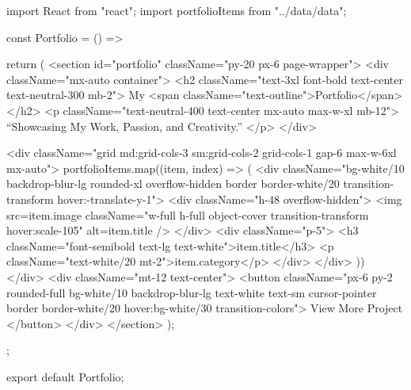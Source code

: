 import React from "react";
import { portfolioItems } from "../data/data";

const Portfolio = () => {
  return (
    <section id="portfolio" className="py-20 px-6 page-wrapper">
      <div className="mx-auto container">
        <h2 className="text-3xl font-bold text-center text-neutral-300 mb-2">
          My <span className="text-outline">Portfolio</span>
        </h2>
        <p className="text-neutral-400 text-center mx-auto max-w-xl mb-12">
          “Showcasing My Work, Passion, and Creativity.”
        </p>
      </div>

      <div className="grid md:grid-cols-3 sm:grid-cols-2 grid-cols-1 gap-6 max-w-6xl mx-auto">
        {portfolioItems.map((item, index) => (
          <div className="bg-white/10 backdrop-blur-lg rounded-xl overflow-hidden border border-white/20 transition-transform hover:-translate-y-1">
            <div className="h-48 overflow-hidden">
              <img
                src={item.image}
                className="w-full h-full object-cover transition-transform hover:scale-105"
                alt={item.title}
              />
            </div>
            <div className="p-5">
              <h3 className="font-semibold text-lg text-white">{item.title}</h3>
              <p className="text-white/20 mt-2">{item.category}</p>
            </div>
          </div>
        ))}
      </div>
      <div className="mt-12 text-center">
        <button className="px-6 py-2 rounded-full bg-white/10 backdrop-blur-lg text-white text-sm cursor-pointer border border-white/20 hover:bg-white/30 transition-colors">
          View More Project
        </button>
      </div>
    </section>
  );
};

export default Portfolio;
